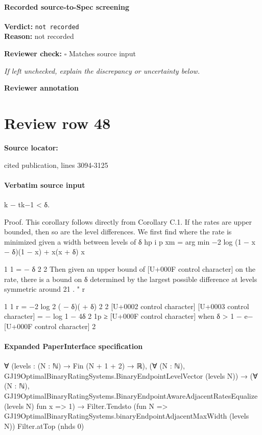 \documentclass[10pt]{article}
\newcommand{\reviewerbox}{%
  \par\noindent\fbox{\parbox{0.96\linewidth}{\rule{0pt}{0.38in}}}\par
}
\newcommand{\reviewmatch}[1]{%
  \par\noindent\textbf{Reviewer check:} $\square$\; #1\par
  \noindent\emph{If left unchecked, explain the discrepancy or uncertainty below.}\par
}
\begin{document}
\paragraph{Recorded source-to-Spec screening}
\textbf{Verdict:} \texttt{not recorded}
\\
\textbf{Reason:} not recorded
\reviewmatch{Matches source input}
\noindent\textbf{Reviewer annotation}\par
\reviewerbox
\clearpage
\hypertarget{source-claim-510e870d600e0e8e}{}
\section*{Review row 48}
\textbf{Source locator:} {\footnotesize\raggedright cited publication, lines 3094-\allowbreak{}3125\par}
\paragraph{Verbatim source input}
\begin{ReviewVerbatim}
k − tk−1 < δ.

Proof. This corollary follows directly from Corollary C.1. If the rates are upper bounded, then so
are the level differences.
We first find where the rate is minimized given a width between levels of δ
hp
i
p
xm = arg min −2 log
(1 − x − δ)(1 − x) + x(x + δ)
x

1 1
= − δ
2 2
Then given an upper bound of [U+000F control character] on the rate, there is a bound on δ determined by the largest
possible difference at levels symmetric around 21 .
" r

1
1
r = −2 log 2 ( − δ)( + δ)
2
2
[U+0002 control character]
[U+0003 control character]
= − log 1 − 4δ 2
1p
≥ [U+000F control character] when δ >
1 − e−[U+000F control character]
2
\end{ReviewVerbatim}


\paragraph{Expanded PaperInterface specification}
\begin{ReviewVerbatim}
∀ (levels : (N : ℕ) → Fin (N + 1 + 2) → ℝ),
  (∀ (N : ℕ), GJ19OptimalBinaryRatingSystems.BinaryEndpointLevelVector (levels N)) →
    (∀ (N : ℕ), GJ19OptimalBinaryRatingSystems.BinaryEndpointAwareAdjacentRatesEqualize (levels N) fun x => 1) →
      Filter.Tendsto (fun N => GJ19OptimalBinaryRatingSystems.binaryEndpointAdjacentMaxWidth (levels N)) Filter.atTop
        (nhds 0)
\end{ReviewVerbatim}
\end{document}
